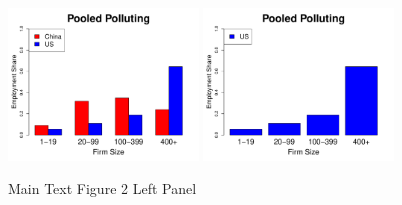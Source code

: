 \documentclass[twoside,12pt,leqno]{article}
\newcommand{\code}{\texttt}
\newcommand{\bcode}[1]{\texttt{\blue{#1}}}
\begin{document}

\newpage
\begin{figure}[h]
    \begin{center}
    \includegraphics[width=0.45\textwidth]{./Figures/Figure2_Left.pdf}
    \includegraphics[width=0.45\textwidth]{./Figures/Figure2_US_Left.pdf}
    \caption{Main Text Figure 2 Left Panel}
    \label{fig:fig2left}
    \end{center}
\end{figure}
\end{document}
